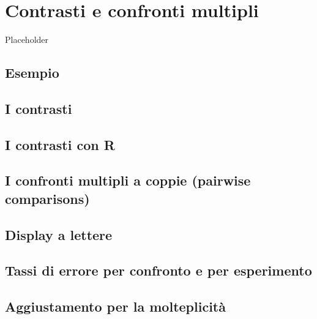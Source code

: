 \documentclass[a4paper,12pt,oneside]{book}
\begin{document}
\hypertarget{contrasti-e-confronti-multipli}{%
\chapter{Contrasti e confronti multipli}\label{contrasti-e-confronti-multipli}}

Placeholder

\hypertarget{esempio}{%
\section{Esempio}\label{esempio}}

\hypertarget{i-contrasti}{%
\section{I contrasti}\label{i-contrasti}}

\hypertarget{i-contrasti-con-r}{%
\section{I contrasti con R}\label{i-contrasti-con-r}}

\hypertarget{i-confronti-multipli-a-coppie-pairwise-comparisons}{%
\section{I confronti multipli a coppie (pairwise comparisons)}\label{i-confronti-multipli-a-coppie-pairwise-comparisons}}

\hypertarget{display-a-lettere}{%
\section{Display a lettere}\label{display-a-lettere}}

\hypertarget{tassi-di-errore-per-confronto-e-per-esperimento}{%
\section{Tassi di errore per confronto e per esperimento}\label{tassi-di-errore-per-confronto-e-per-esperimento}}

\hypertarget{aggiustamento-per-la-molteplicituxe0}{%
\section{Aggiustamento per la molteplicità}\label{aggiustamento-per-la-molteplicituxe0}}
\end{document}
